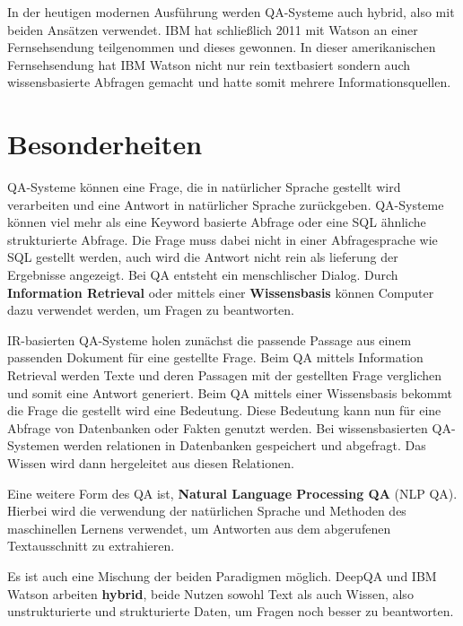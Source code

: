 \documentclass[
        ngerman,
        paper=a4,
        numbers=noendperiod,
]{scrreprt}
\begin{document}
In der heutigen modernen Ausführung werden QA-Systeme auch hybrid, also mit beiden Ansätzen verwendet. IBM hat schließlich 2011 mit Watson an einer Fernsehsendung teilgenommen und dieses gewonnen. In dieser amerikanischen Fernsehsendung hat IBM Watson nicht nur rein textbasiert sondern auch wissensbasierte Abfragen gemacht und hatte somit mehrere Informationsquellen.

\section{Besonderheiten}
QA-Systeme können eine Frage, die in natürlicher Sprache gestellt wird verarbeiten und eine Antwort in natürlicher Sprache zurückgeben. QA-Systeme können viel mehr als eine Keyword basierte Abfrage oder eine SQL ähnliche strukturierte Abfrage. Die Frage muss dabei nicht in einer Abfragesprache wie SQL gestellt werden, auch wird die Antwort nicht rein als lieferung der Ergebnisse angezeigt. Bei QA entsteht ein menschlischer Dialog. Durch \textbf{Information Retrieval} oder mittels einer \textbf{Wissensbasis} können Computer dazu verwendet werden, um Fragen zu beantworten.  

IR-basierten QA-Systeme holen zunächst die passende Passage aus einem passenden Dokument für eine gestellte Frage. Beim QA mittels Information Retrieval werden Texte und deren Passagen mit der gestellten Frage verglichen und somit eine Antwort generiert.
Beim QA mittels einer Wissensbasis bekommt die Frage die gestellt wird eine Bedeutung. Diese Bedeutung kann nun für eine Abfrage von Datenbanken oder Fakten genutzt werden. Bei wissensbasierten QA-Systemen werden relationen in Datenbanken gespeichert und abgefragt. Das Wissen wird dann hergeleitet aus diesen Relationen. 

Eine weitere Form des QA ist, \textbf{Natural Language Processing QA} (NLP QA). Hierbei wird die verwendung der natürlichen Sprache und Methoden des maschinellen Lernens verwendet, um Antworten aus dem abgerufenen Textausschnitt zu extrahieren.

Es ist auch eine Mischung der beiden Paradigmen möglich. DeepQA und IBM Watson arbeiten \textbf{hybrid}, beide Nutzen sowohl Text als auch Wissen, also unstrukturierte und strukturierte Daten, um Fragen noch besser zu beantworten.
\end{document}

